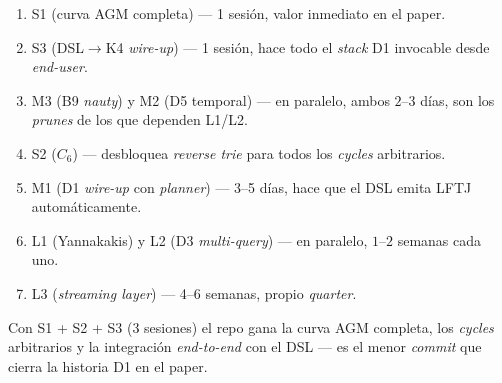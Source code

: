 \documentclass[11pt,a4paper]{report}
\begin{document}
\begin{enumerate}
  \item S1 (curva AGM completa) --- 1 sesión, valor inmediato en el paper.
  \item S3 (DSL$\to$K4 \emph{wire-up}) --- 1 sesión, hace todo el \emph{stack} D1 invocable desde \emph{end-user}.
  \item M3 (B9 \emph{nauty}) y M2 (D5 temporal) --- en paralelo, ambos $2\text{--}3$ días, son los \emph{prunes} de los que dependen L1/L2.
  \item S2 ($C_6$) --- desbloquea \emph{reverse trie} para todos los \emph{cycles} arbitrarios.
  \item M1 (D1 \emph{wire-up} con \emph{planner}) --- 3--5 días, hace que el DSL emita LFTJ automáticamente.
  \item L1 (Yannakakis) y L2 (D3 \emph{multi-query}) --- en paralelo, $1\text{--}2$ semanas cada uno.
  \item L3 (\emph{streaming layer}) --- 4--6 semanas, propio \emph{quarter}.
\end{enumerate}

Con S1 + S2 + S3 (3 sesiones) el repo gana la curva AGM completa, los \emph{cycles} arbitrarios y la integración \emph{end-to-end} con el DSL --- es el menor \emph{commit} que cierra la historia D1 en el paper.
\end{document}
